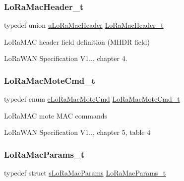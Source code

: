 \subsubsection{\texorpdfstring{Lo\+Ra\+Mac\+Header\+\_\+t}{LoRaMacHeader\_t}}
{\footnotesize\ttfamily typedef union \mbox{\hyperlink{unionu_lo_ra_mac_header}{u\+Lo\+Ra\+Mac\+Header}} \mbox{\hyperlink{group___l_o_r_a_m_a_c_gaff5f7004a7a48d53d858e26834b53efa}{Lo\+Ra\+Mac\+Header\+\_\+t}}}

Lo\+Ra\+M\+AC header field definition (M\+H\+DR field)

Lo\+Ra\+W\+AN Specification V1.., chapter 4. \mbox{\label{group___l_o_r_a_m_a_c_ga7ef7dff520934ecc71835673f2acd015}} 
\subsubsection{\texorpdfstring{Lo\+Ra\+Mac\+Mote\+Cmd\+\_\+t}{LoRaMacMoteCmd\_t}}
{\footnotesize\ttfamily typedef enum \mbox{\hyperlink{group___l_o_r_a_m_a_c_gaa56523d6cd76c438d6bc4263b5254d73}{e\+Lo\+Ra\+Mac\+Mote\+Cmd}} \mbox{\hyperlink{group___l_o_r_a_m_a_c_ga7ef7dff520934ecc71835673f2acd015}{Lo\+Ra\+Mac\+Mote\+Cmd\+\_\+t}}}

Lo\+Ra\+M\+AC mote M\+AC commands

Lo\+Ra\+W\+AN Specification V1.., chapter 5, table 4 \mbox{\label{group___l_o_r_a_m_a_c_gad9c979008eadcd47b4d0f90bdae38b44}} 
\subsubsection{\texorpdfstring{Lo\+Ra\+Mac\+Params\+\_\+t}{LoRaMacParams\_t}}
{\footnotesize\ttfamily typedef struct \mbox{\hyperlink{structs_lo_ra_mac_params}{s\+Lo\+Ra\+Mac\+Params}} \mbox{\hyperlink{group___l_o_r_a_m_a_c_gad9c979008eadcd47b4d0f90bdae38b44}{Lo\+Ra\+Mac\+Params\+\_\+t}}}

